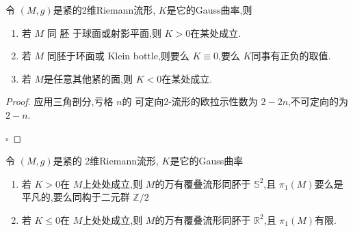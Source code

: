 \documentclass[../../几何与拓扑.tex]{subfiles}
\begin{document}
\begin{corollary}
    令 \(  \left( M,g \right)   \)是紧的2维Riemann流形, \(  K  \)是它的Gauss曲率,则
    \begin{enumerate}
        \item 若 \(  M  \) 同 胚 于球面或射影平面,则 \(K> 0    \)在某处成立.
        \item 若 \(  M  \) 同胚于环面或 Klein bottle,则要么 \(  K\equiv 0  \),要么 \(  K  \)同事有正负的取值.
        \item 若 \(  M  \)是任意其他紧的面,则 \(  K<0  \)在某处成立.    
    \end{enumerate}
      
\end{corollary}
\begin{proof}
    应用三角剖分,亏格 \(  n  \)的 可定向2-流形的欧拉示性数为 \(  2-2n  \),不可定向的为 \(  2-n  \).  

    \hfill $\square$
\end{proof}

\begin{corollary}
    令 \(  \left( M,g \right)   \)是紧的 2维Riemann流形, \(  K  \)是它的Gauss曲率
    \begin{enumerate}
        \item 若 \(  K> 0  \)在 \(  M  \)上处处成立,则 \(  M  \)的万有覆叠流形同肧于 \(  \mathbb{S}^{2}  \),且 \(  \pi _1 \left( M \right)   \)要么是平凡的,要么同构于二元群 \(  \mathbb{Z} /2  \) 
        \item 若 \(  K\le 0  \)在 \(  M  \)上处处成立,则 \(  M  \)的万有覆叠流形同肧于 \(  \mathbb{R} ^{2}  \),且 \(  \pi _1 \left( M \right)   \)有限.          
    \end{enumerate}
      
\end{corollary}
\end{document}
